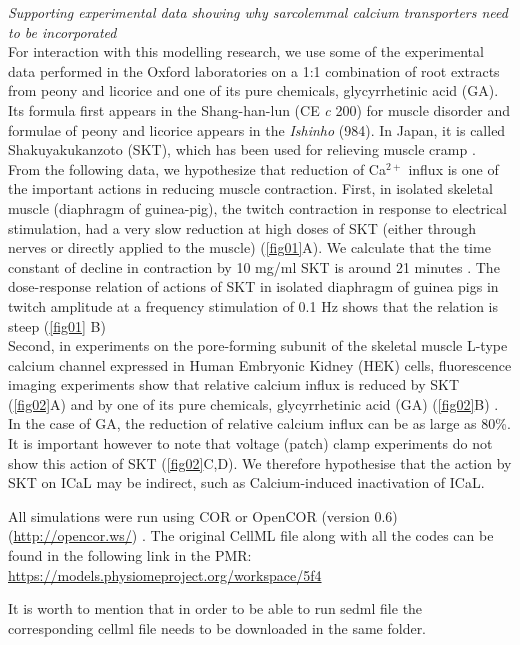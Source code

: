 \documentclass[fleqn,10pt]{physiome}
\begin{document}
\textit{Supporting experimental data showing why sarcolemmal calcium transporters need to be incorporated}\\\newline
For interaction with this modelling research, we use some of the experimental data performed in the Oxford laboratories on a 1:1 combination of root extracts from peony and licorice and one of its pure chemicals, glycyrrhetinic acid (GA). Its formula first appears in the Shang-han-lun (CE \textit{c} 200) for muscle disorder and formulae of peony and licorice appears in the \textit{Ishinho} (984). In Japan, it is called Shakuyakukanzoto (SKT), which has been used for relieving muscle cramp \citep{hyodo2006immediate}. From the following data, we hypothesize that reduction of Ca$^{2+}$ influx is one of the important actions in reducing muscle contraction. First, in isolated skeletal muscle (diaphragm of guinea-pig), the twitch contraction in response to electrical stimulation, had a very slow reduction at high doses of SKT (either through nerves or directly applied to the muscle) (\autoref{fig01}A). We calculate that the time constant of decline in contraction by 10 mg/ml SKT is around 21 minutes \citep{Sam2015Actions}. The dose-response relation of actions of SKT in isolated diaphragm of guinea pigs in twitch amplitude at a frequency stimulation of 0.1 Hz shows that the relation is steep (\autoref{fig01} B) \citep{Sam2015Actions}\\
Second, in experiments on the pore-forming subunit of the skeletal muscle L-type calcium channel expressed in Human Embryonic Kidney (HEK) cells, fluorescence imaging experiments show that relative calcium influx is reduced by SKT (\autoref{fig02}A) and by one of its pure chemicals, glycyrrhetinic acid (GA) (\autoref{fig02}B) \citep{Noble2019Incorporation}. In the case of GA, the reduction of relative calcium influx can be as large as 80\%. It is important however to note that voltage (patch) clamp experiments do not show this action of SKT (\autoref{fig02}C,D). We therefore hypothesise that the action by SKT on ICaL may be indirect, such as Calcium-induced inactivation of ICaL.

All simulations were run using COR or OpenCOR (version 0.6) (\url{http://opencor.ws/}) \citep{Noble2019Incorporation}. 
The original CellML file along with all the codes can be found in the following link in the PMR:\newline
\url{https://models.physiomeproject.org/workspace/5f4}

It is worth to mention that in order to be able to run sedml file the corresponding cellml file needs to be downloaded in the same folder.
\end{document}
